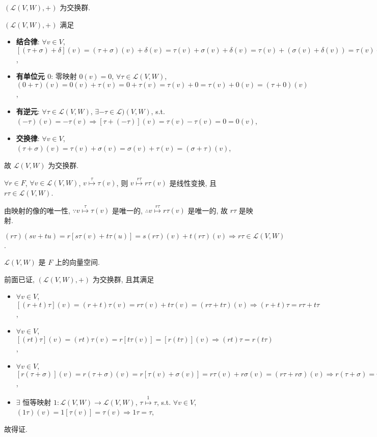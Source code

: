 \documentclass{note}
\begin{document}
$(\mathcal{L}(V,W),+)$ 为交换群.
\begin{pf}
    $(\mathcal{L}(V,W),+)$ 满足
    \begin{itemize}
        \item[(1)] \textbf{结合律}: $\forall v\in V$, $[(\tau+\sigma)+\delta](v)=(\tau+\sigma)(v)+\delta(v)=\tau(v)+\sigma(v)+\delta(v)=\tau(v)+(\sigma(v)+\delta(v))=\tau(v)+(\sigma+\delta)(v)=[\tau+(\sigma+\delta)](v)\Longrightarrow(\tau+\sigma)+\delta=\tau+(\sigma+\delta)$,
        \item[(2)] \textbf{有单位元 $0$}: 零映射 $0(v)=0$, $\forall\tau\in\mathcal{L}(V,W)$, $(0+\tau)(v)=0(v)+\tau(v)=0+\tau(v)=\tau(v)+0=\tau(v)+0(v)=(\tau+0)(v)$,
        \item[(3)] \textbf{有逆元}: $\forall\tau\in\mathcal{L}(V,W)$, $\exists-\tau\in\mathcal{L})(V,W)$, s.t. $(-\tau)(v)=-\tau(v)\Longrightarrow[\tau+(-\tau)](v)=\tau(v)-\tau(v)=0=0(v)$,
        \item[(4)] \textbf{交换律}: $\forall v\in V$, $(\tau+\sigma)(v)=\tau(v)+\sigma(v)=\sigma(v)+\tau(v)=(\sigma+\tau)(v)$,
    \end{itemize}
    故 $\mathcal{L}(V,W)$ 为交换群.
\end{pf}

$\forall r\in F$, $\forall v\in\mathcal{L}(V,W)$, $v\overset{\tau}{\mapsto}\tau(v)$, 则 $v\overset{r\tau}{\mapsto}r\tau(v)$ 是线性变换, 且 $r\tau\in\mathcal{L}(V,W)$.
\begin{pf}
    由映射的像的唯一性, $\because v\overset{\tau}{\mapsto}\tau(v)$ 是唯一的, $\therefore v\overset{r\tau}{\mapsto}r\tau(v)$ 是唯一的, 故 $r\tau$ 是映射.

    $(r\tau)(sv+tu)=r[s\tau(v)+t\tau(u)]=s(r\tau)(v)+t(r\tau)(v)\Longrightarrow r\tau\in\mathcal{L}(V,W)$.
\end{pf}

$\mathcal{L}(V,W)$ 是 $F$ 上的向量空间.
\begin{pf}
    前面已证, $(\mathcal{L}(V,W),+)$ 为交换群, 且其满足
    \begin{itemize}
        \item[(1)] $\forall v\in V$, $[(r+t)\tau](v)=(r+t)\tau(v)=r\tau(v)+t\tau(v)=(r\tau+t\tau)(v)\Longrightarrow (r+t)\tau=r\tau+t\tau$,
        \item[(2)] $\forall v\in V$, $[(rt)\tau](v)=(rt)\tau(v)=r[t\tau(v)]=[r(t\tau)](v)\Longrightarrow(rt)\tau=r(t\tau)$,
        \item[(3)] $\forall v\in V$, $[r(\tau+\sigma)](v)=r(\tau+\sigma)(v)=r[\tau(v)+\sigma(v)]=r\tau(v)+r\sigma(v)=(r\tau+r\sigma)(v)\Longrightarrow r(\tau+\sigma)=r\tau+r\sigma$,
        \item[(4)] $\exists$ 恒等映射 $1:\mathcal{L}(V,W)\rightarrow\mathcal{L}(V,W)$, $\tau\overset{1}{\mapsto}\tau$, s.t. $\forall v\in V$, $(1\tau)(v)=1[\tau(v)]=\tau(v)\Longrightarrow 1\tau=\tau$,
    \end{itemize}
    故得证.
\end{pf}
\end{document}
